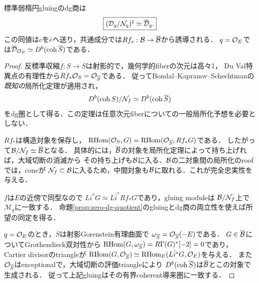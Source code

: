 \begin{theorem}[収縮圏の特異gluing表示]\label{thm:singular-gluing-target}
標準弱楕円gluingのdg商は
\[
 \boxed{(\mathcal D_q/\mathcal N_q)^\natural\simeq\overline{\mathcal D}_q.}
\]
この同値は$e$を$\bar e$へ送り，共通成分では$Rf_*:\mathcal B\to\overline{\mathcal B}$から誘導される．
$q=\mathcal O_E$では$\overline{\mathcal D}_{\mathcal O_E}\simeq D^b(\operatorname{coh}\overline S)$である．
\end{theorem}
\begin{proof}
反標準収縮$f:S\to\overline S$は射影的で，幾何学的fiberの次元は高々1，
Du Val特異点の有理性から$Rf_*\mathcal O_S=\mathcal O_{\overline S}$である．
従ってBondal--Kapranov--Schechtman\cite[Theorem 2.14, \S2F]{BKSWalls}の
\emph{既知の}局所化定理が適用され，
\[
 D^b(\operatorname{coh} S)/\mathcal N_f\simeq D^b(\operatorname{coh}\overline S)
\]
をdg圏として得る．この定理は任意次元fiberについての一般局所化予想を必要としない．

$Rf_*$は構造対象を保存し，
$\operatorname{RHom}(\mathcal O_S,G)=\operatorname{RHom}(\mathcal O_{\overline S},Rf_*G)$である．
したがって$\mathcal B/\mathcal N_f\simeq\overline{\mathcal B}$となる．
具体的には，$\overline{\mathcal B}$の対象を局所化定理によって持ち上げれば，大域切断の消滅から
その持ち上げも$\mathcal B$に入る．$\mathcal B$の二対象間の局所化のroofでは，coneが
$\mathcal N_f\subset\mathcal B$に入るため，中間対象も$\mathcal B$に取れる．これが完全忠実性を与える．

$f$は$E$の近傍で同型なので
$Li^*G\simeq L\bar i^*Rf_*G$であり，gluing moduleは
$\mathcal B/\mathcal N_f$上で$\mathcal M_q$に一致する．
命題\ref{prop:zero-dg-quotient}のgluingとdg商の両立性を使えば所望の同定を得る．

$q=\mathcal O_E$のとき，$\overline S$は射影Gorenstein有理曲面で
$\omega_{\overline S}=\mathcal O_{\overline S}(-E)$である．
$G\in\overline{\mathcal B}$についてGrothendieck双対性から
$\operatorname{RHom}(G,\omega_{\overline S})=R\Gamma(G)^*[-2]=0$であり，
Cartier divisorのtriangleが
$\operatorname{RHom}(G,\mathcal O_{\overline S})\simeq\operatorname{RHom}_E(L\bar i^*G,\mathcal O_E)$を与える．
また$\mathcal O_{\overline S}$はexceptionalで，大域切断の評価triangleにより
$D^b(\operatorname{coh}\overline S)$は$\overline{\mathcal B}$とこの対象で生成される．
従って上記gluingはその有界coherent導来圏に一致する．
\end{proof}

